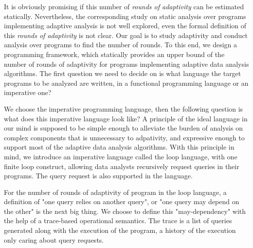 It is obviously promising if this number of \emph{rounds of adaptivity} can be estimated statically. Nevertheless, the corresponding study on static analysis over programs implementing adaptive analysis is not well explored, even the formal definition of this \emph{rounds of adaptivity} is not clear. Our goal is to study adaptivity and conduct analysis over programs to find the number of rounds.
To this end, we design a programming framework, which statically provides an upper bound of the number of rounds of adaptivity for programs implementing adaptive data analysis algorithms. The first question we need to decide on is what language the target programs to be analyzed are written, in a functional programming language or an imperative one?     

 We choose the imperative programming language, then the following question is what does this imperative language look like? A principle of the ideal language in our mind is supposed to be simple enough to alleviate the burden of analysis on complex components that is unnecessary to adpativity, and expressive enough to support most of the adaptive data analysis algorithms. With this principle in mind, we introduce an imperative language called the loop language, with one finite loop construct, allowing data analysts recursively request queries in their programs. The query request is also supported in the language.


 For the number of rounds of adaptivity of program in the loop language, a definition of "one query relies on another query", or "one query may depend on the other" is the next big thing. We choose to define this "may-dependency" with the help of a trace-based operational semantics.  
 The trace is a list of queries generated along with the execution of the program, a history of the execution only caring about query requests.

